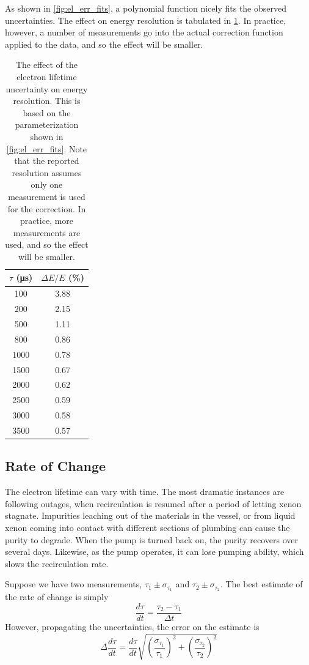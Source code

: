 \documentclass[herrin-thesis.tex]{subfiles}
\begin{document}
As shown in \cref{fig:el_err_fits}, a polynomial function nicely fits the observed uncertainties. The effect on energy resolution is tabulated in \cref{tab:el_res_dtau}. In practice, however, a number of measurements go into the actual correction function applied to the data, and so the effect will be smaller.

\begin{table}[htd]
\centering
\begin{tabular}{c|c}
	\(\tau\) (\si{\micro\second})	&	\(\Delta E / E\) (\%) 	\\ \hline
	100					&	3.88				\\
	200					&	2.15				\\
	500					&	1.11				\\
	800					&	0.86				\\
	1000					&	0.78				\\
	1500					&	0.67				\\
	2000					&	0.62				\\
	2500					&	0.59				\\
	3000					&	0.58				\\
	3500					&	0.57
\end{tabular}
\caption[Electron lifetime uncertainty effect on resolution]{The effect of the electron lifetime uncertainty on energy resolution. This is based on the parameterization shown in \cref{fig:el_err_fits}. Note that the reported resolution assumes only one measurement is used for the correction. In practice, more measurements are used, and so the effect will be smaller.}
\label{tab:el_res_dtau}
\end{table}

\subsection{Rate of Change}
The electron lifetime can vary with time. The most dramatic instances are following outages, when recirculation is resumed after a period of letting xenon stagnate. Impurities leaching out of the materials in the vessel, or from liquid xenon coming into contact with different sections of plumbing can cause the purity to degrade. When the pump is turned back on, the purity recovers over several days. Likewise, as the pump operates, it can lose pumping ability, which slows the recirculation rate.

Suppose we have two measurements, \(\tau_1 \pm \sigma_{\tau_1}\) and \(\tau_2 \pm \sigma_{\tau_2}\). The best estimate of the rate of change is simply
\[\frac{d\tau}{dt} = \frac{\tau_2 - \tau_1}{\Delta t}\]
However, propagating the uncertainties, the error on the estimate is
\[\Delta \frac{d\tau}{dt} = \frac{d\tau}{dt}\sqrt{\left(\frac{\sigma_{\tau_1}}{\tau_1}\right)^2 + \left(\frac{\sigma_{\tau_2}}{\tau_2}\right)^2}\]
\end{document}
